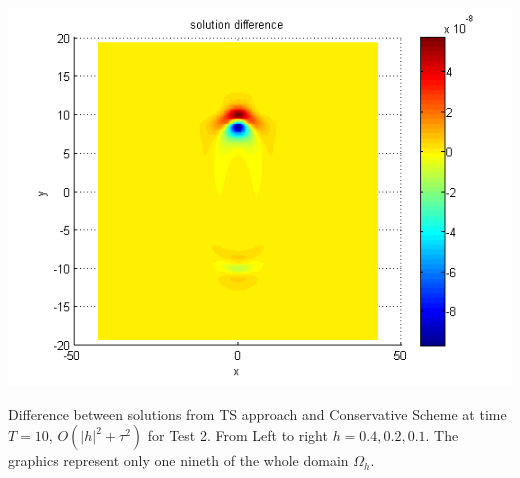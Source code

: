 \documentclass{beamer}
\begin{document}
\begin{frame}
\begin{center}
\begin{minipage}[b]{0.32\linewidth}
		\includegraphics[width=\linewidth]{../amitans/figures/compare_128_bt1_c09_h010.png}		 
	\end{minipage}
\end{center}
Difference between solutions from TS approach and Conservative Scheme at time $T=10$, $O(|h|^2 + \tau^2)$ for Test 2. From Left to right $h=0.4, 0.2, 0.1$. The graphics represent only one nineth of the whole domain $\Omega_h$.
\end{frame}

\end{document}
